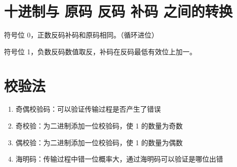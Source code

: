 \section{十进制与 原码 反码 补码 之间的转换}

符号位 0，正数反码补码和原码相同。（循环进位）

符号位 1，负数反码数值取反，补码在反码最低有效位上加一。

\section{校验法}

\begin{enumerate}

    \item 奇偶校验码：可以验证传输过程是否产生了错误
    \item 奇校验：为二进制添加一位校验码，使 1 的数量为奇数
    \item 偶校验：为二进制添加一位校验码，使 1 的数量为偶数
    \item 海明码：传输过程中错一位概率大，通过海明码可以验证是哪位出错

\end{enumerate}

\newpage
